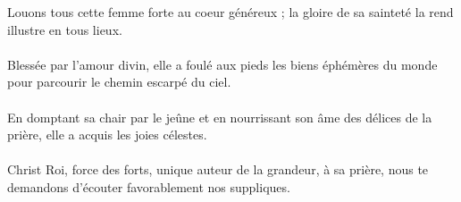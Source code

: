Louons tous cette femme forte au coeur généreux ; la gloire de sa sainteté la rend illustre en tous lieux.\\
\\
Blessée par l’amour divin, elle a foulé aux pieds les biens éphémères du monde pour parcourir le chemin escarpé du ciel.\\
\\
En domptant sa chair par le jeûne et en nourrissant son âme des délices de la prière, elle a acquis les joies célestes.\\
\\
Christ Roi, force des forts, unique auteur de la grandeur, à sa prière, nous te demandons d'écouter favorablement nos suppliques.